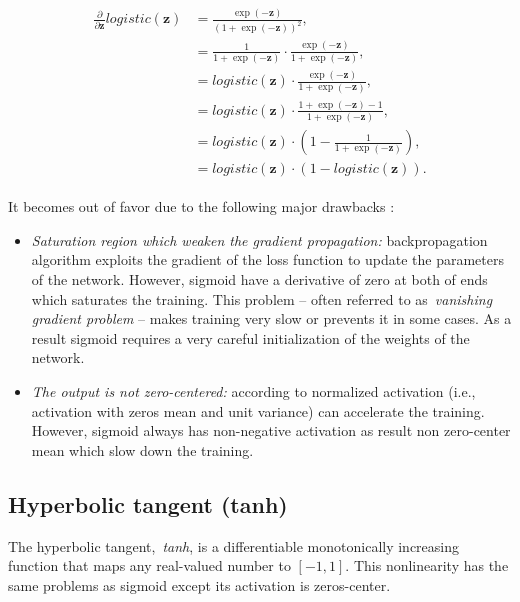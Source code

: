 \begin{align}\label{eq:logistic_derivative}
\begin{split}%
    \frac{\partial}{\partial \mathbf{z}}logistic(\mathbf{z}) &=
        \frac{\exp(\mathbf{-z})}{\left(1+\exp(-\mathbf{z})\right)^2} ,\\
    &= \frac{1}{1+\exp(-\mathbf{z})} \cdot
        \frac{\exp(-\mathbf{z})}{1+\exp(-\mathbf{z})} ,\\
    &= logistic(\mathbf{z}) \cdot
        \frac{\exp(-\mathbf{z})}{1+\exp(-\mathbf{z})} ,\\
    &= logistic(\mathbf{z}) \cdot
        \frac{1+\exp(-\mathbf{z})-1}{1+\exp(-\mathbf{z})} ,\\
    &= logistic(\mathbf{z}) \cdot
        \left(1-\frac{1}{1+\exp(-\mathbf{z})}\right) ,\\
    &= logistic(\mathbf{z}) \cdot (1-logistic(\mathbf{z})).
\end{split}
\end{align}

It becomes out of favor due to the following major drawbacks :
\begin{itemize}
    \item \emph{Saturation region which weaken the gradient propagation:}
        backpropagation algorithm exploits the gradient of the loss function to update the parameters of the network. 
        However, sigmoid have a derivative of zero at both of ends which saturates the training. This problem -- often referred to as~\emph{vanishing gradient problem} -- makes training very slow or prevents it in some cases. As a result sigmoid requires a very careful initialization of the weights of the network.
    \item \emph{The output is not zero-centered:} 
    according to \cite{ioffe2015batch} normalized activation (i.e., activation with zeros mean and unit variance) can accelerate the training. However, sigmoid always has non-negative activation as result non zero-center mean which slow down the training.
\end{itemize}

\subsection{Hyperbolic tangent (tanh)}\label{sec:tanh}

The hyperbolic tangent,~\emph{tanh}, is a differentiable monotonically increasing function that maps any real-valued number to $[-1, 1]$. This nonlinearity has the same problems as sigmoid except its activation is zeros-center.

